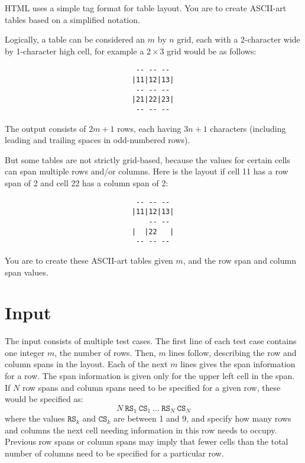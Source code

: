 
HTML uses a simple tag format for table layout.  You are to create
ASCII-art tables based on a simplified notation.

Logically, a table can be considered an $m$ by $n$ grid, each with a
2-character wide by 1-character high cell, for example a $2 \times 3$ grid
would be as follows:
\begin{verbatim}
                               -- -- -- 
                              |11|12|13|
                               -- -- -- 
                              |21|22|23|
                               -- -- -- 
\end{verbatim}
The output consists of $2m+1$ rows, each having $3n+1$ characters
(including leading and trailing spaces in odd-numbered rows).

But some tables are not strictly grid-based, because the values for
certain cells can span multiple rows and/or columns.  Here is the
layout if cell 11 has a row span of 2 and cell 22 has a column span of
2:
\begin{verbatim}
                               -- -- -- 
                              |11|12|13|
                                  -- -- 
                              |  |22   |
                               -- -- --  
\end{verbatim}
You are to create these ASCII-art tables given $m$, and the row span
and column span values.  %

\section*{Input}
The input consists of multiple test cases.
The first line of each test case contains one
integer $m$, the number of rows.
Then, $m$ lines follow, describing the row and column
spans in the layout.  Each of the next $m$ lines gives the span information
for a row. The span information is given only for the upper
left cell in the span.  If $N$ row spans and column spans need to be
specified for a given row, these would be specified as:
\[
N \  \texttt{RS}_1\  \texttt{CS}_1\  \ldots\ \texttt{RS}_N\ \texttt{CS}_N
\]
where the values $\texttt{RS}_k$ and $\texttt{CS}_k$ are between 1 and 9, and specify how
many rows and columns the next cell needing information in this row
needs to occupy.  Previous row spans or column spans may imply that
fewer cells than the total number of columns need to be specified
for a particular row.


